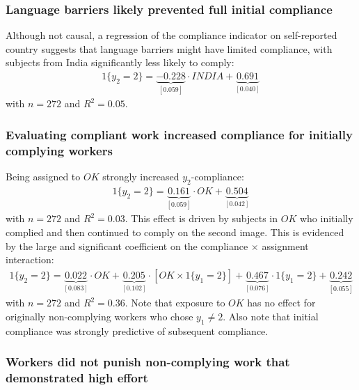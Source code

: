 \documentclass[12pt]{article}
\begin{document}
\subsubsection{Language barriers likely prevented full initial compliance} 

Although not causal, a regression of the compliance indicator on
self-reported country suggests that language barriers might have
limited compliance, with subjects from India significantly less likely
to comply:
\begin{align}
  1\{y_2=2\} = \underbrace{-0.228}_{[0.059]}\cdot INDIA + 
\underbrace{0.691}_{[0.040]}
\end{align} 
with $n = 272$ and $R^2 = 0.05$.

\subsubsection{Evaluating compliant work increased compliance for initially complying workers}
Being assigned to $OK$ strongly increased $y_2$-compliance:
\begin{align} 
  1\{y_2=2\} = \underbrace{0.161}_{[0.059]}\cdot OK + 
\underbrace{0.504}_{[0.042]}\end{align}
with $n =272$ and $R^2 = 0.03$.  This effect is
driven by subjects in $OK$ who initially complied and then continued
to comply on the second image.  This is evidenced by the large and
significant coefficient on the compliance $\times$ assignment
interaction:
\begin{align}1\{y_2=2\} = \underbrace{0.022}_{[0.083]}\cdot OK + 
\underbrace{0.205}_{[0.102]}\cdot \left[OK\times 
1\{y_1=2\} \right] +
\underbrace{0.467}_{[0.076]}\cdot
1\{y_1=2\} +
\underbrace{0.242}_{[0.055]}\end{align} with $n
=272$ and $R^2 = 0.36$. Note that exposure to $OK$
has no effect for originally non-complying workers who chose $y_1 \ne
2$. Also note that initial compliance was strongly predictive
of subsequent compliance.

\subsubsection{Workers did not punish non-complying work that demonstrated high effort} 
\end{document}
